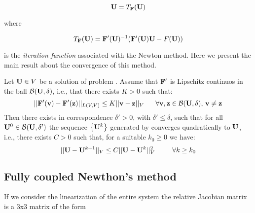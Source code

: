 \begin{equation}
\label{eq: fixed point U}
\mathbf{U} = T_{\mathbf{F}}(\mathbf{U})
\end{equation}

where 

\begin{equation}
\label{eq: iteration function}
T_{\mathbf{F}}(\mathbf{U}) = \mathbf{F}'(\mathbf{U})^{-1}(\mathbf{F}'(\mathbf{U})\mathbf{U}-F(\mathbf{U}))
\end{equation}

is the \textit{iteration function} associated with the Newton method.
Here we present the main result about the convergence of this method.

\begin{Teorema}
\label{theorem: newton convergence}
Let  $\mathbf{U}\in V$ be a solution of problem . Assume that $\mathbf{F'}$ is Lipschitz continuos in the ball $\mathcal{B}(\mathbf{U},\delta)$, i.e., that there exists  $K>0$ such that:
\begin{equation}
||\vect{F'}(\vect{v})-\vect{F'}(\vect{z})||_{L(V,V)} \leq K ||\vect{v}-\vect{z}||_V \psp{10} \forall \vect{v},\vect{z} \in \mathcal{B}(\vect{U},\delta), \, \vect{v}\neq \vect{z}
\end{equation}
Then there exists in correspondence $\delta '>0$, with $\delta '\leq\delta$, such that for all $\mathbf{U}^0 \in \mathcal{B}(\mathbf{U},\delta ')$ the sequence $\left\{ \mathbf{U}^k \right\}$ generated by  converges quadratically to $\mathbf{U}$, i.e., there exists $C>0$ such that, for a suitable $k_0\geq 0$ we have:
\begin{equation}
\label{eq: convergece newton}
||\vect{U}-\vect{U}^{k+1}||_V\leq C||\vect{U}-\vect{U}^k||_V^2 \psp{15} \forall k\geq k_0
\end{equation}
\end{Teorema}


\subsection{Fully coupled Newthon's method}


If we consider the linearization of the entire system  the relative Jacobian matrix is a 3x3 matrix of the form

